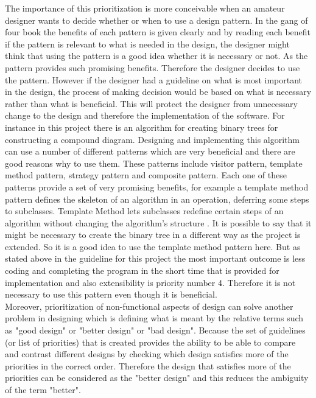 \documentclass[10pt, a4paper, titlepage]{article}
\begin{document}
The importance of this prioritization is more conceivable when an amateur designer wants to decide whether or when to use a design pattern. In the gang of four book \cite{Gof_book} the benefits of each pattern is given clearly and by reading each benefit if the pattern is relevant to what is needed in the design, the designer might think that using the pattern is a good idea whether it is necessary or not. As the pattern provides such promising benefits. Therefore the designer decides to use the pattern. However if the designer had a guideline on what is most important in the design, the process of making decision would be based on what is necessary rather than what is beneficial. This will protect the designer from unnecessary change to the design and therefore the implementation of the software. For instance in this project there is an algorithm for creating binary trees for constructing a compound diagram. Designing and implementing this algorithm can use a number of different patterns which are very beneficial and there are good reasons why to use them. These patterns include visitor pattern, template method pattern, strategy pattern and composite pattern. Each one of these patterns provide a set of very promising benefits, for example a template method pattern defines the skeleton of an algorithm in an operation, deferring some steps to subclasses. Template Method lets subclasses redefine certain steps of an algorithm without changing the algorithm's structure \cite{Gof_book}. It is possible to say that it might be necessary to create the binary tree in a different way as the project is extended. So it is a good idea to use the template method pattern here. But as stated above in the guideline for this project the most important outcome is less coding and completing the program in the short time that is provided for implementation and also extensibility is priority number 4. Therefore it is not necessary to use this pattern even though it is beneficial.\\

Moreover, prioritization of non-functional aspects of design can solve another problem in designing which is defining what is meant by the relative terms such as "good design" or "better design" or "bad design". Because the set of guidelines (or list of priorities) that is created provides the ability to be able to compare and contrast different designs by checking which design satisfies more of the priorities in the correct order. Therefore the design that satisfies more of the priorities can be considered as the "better design" and this reduces the ambiguity of the term "better". 
\end{document}
